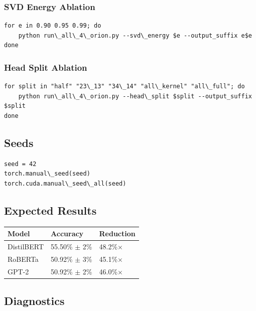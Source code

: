 \subsubsection{SVD Energy Ablation}

\begin{lstlisting}
for e in 0.90 0.95 0.99; do
    python run\_all\_4\_orion.py --svd\_energy $e --output_suffix e$e
done
\end{lstlisting}

\subsubsection{Head Split Ablation}

\begin{lstlisting}
for split in "half" "23\_13" "34\_14" "all\_kernel" "all\_full"; do
    python run\_all\_4\_orion.py --head\_split $split --output_suffix $split
done
\end{lstlisting}

\subsection{Seeds}

\begin{lstlisting}
seed = 42
torch.manual\_seed(seed)
torch.cuda.manual\_seed\_all(seed)
\end{lstlisting}

\subsection{Expected Results}

\begin{table}[H]
\centering
\small
\begin{tabular}{lll}
\toprule
\textbf{Model} & \textbf{Accuracy} & \textbf{Reduction} \\
\midrule
DistilBERT & 55.50\% $\pm$ 2\% & 48.2\%$\times$ \\
RoBERTa & 50.92\% $\pm$ 3\% & 45.1\%$\times$ \\
GPT-2 & 50.92\% $\pm$ 2\% & 46.0\%$\times$ \\
\bottomrule
\end{tabular}
\end{table}

\subsection{Diagnostics}

